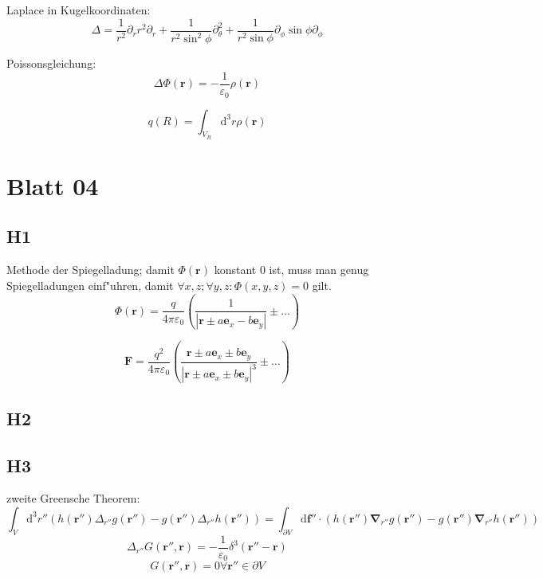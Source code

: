 \documentclass[titlepage,11pt,a4paper,ngerman]{report}
\newcommand{\dd}{\mathrm{d}}
\renewcommand{\vec}[1]{\bm{#1}}
\newcommand{\vabla}{\vec{\nabla}}
\newcommand{\vepsilon}{\varepsilon}
\begin{document}
\subsection{}

Laplace in Kugelkoordinaten:
\[\Delta=\frac{1}{r^2}\partial_rr^2\partial_r+\frac{1}{r^2\sin^2\phi}\partial_\theta^2+\frac{1}{r^2\sin\phi}\partial_\phi\sin\phi\partial_\phi\]

Poissonsgleichung:
\[\Delta\Phi(\vec{r})=-\frac{1}{\vepsilon_0}\rho(\vec{r})\]

\[q(R)=\int_{V_R}\dd^3r\rho(\vec{r})\]

\subsection{}

\subsection{}

\section{Blatt 04}

\subsection{H1}

Methode der Spiegelladung; damit $\Phi(\vec{r})$ konstant $0$ ist, muss man genug Spiegelladungen einf"uhren, damit $\forall x,z;\forall y,z:\Phi(x,y,z)=0$ gilt.
\[\Phi(\vec{r})=\frac{q}{4\pi\vepsilon_0}\left(\frac{1}{|\vec{r}\pm a\vec{e}_x-b\vec{e}_y|}\pm\ldots\right)\]

\[\vec{F}=\frac{q^2}{4\pi\vepsilon_0}\left(\frac{\vec{r}\pm a\vec{e}_x\pm b\vec{e}_y}{|\vec{r}\pm a\vec{e}_x\pm b\vec{e}_y|^3}\pm\ldots\right)\]

\subsection{H2}



\subsection{H3}

zweite Greensche Theorem:
\[\int_V\dd^3r''(h(\vec{r}'')\Delta_{r''}g(\vec{r}'')-g(\vec{r}'')\Delta_{r''}h(\vec{r}''))=\int_{\partial V}\dd\vec{f}''\cdot(h(\vec{r}'')\vabla_{r''}g(\vec{r}'')-g(\vec{r}'')\vabla_{r''}h(\vec{r}''))\]
\[
\Delta_{r''}G(\vec{r}'',\vec{r})=-\frac{1}{\vepsilon_0}\delta^3(\vec{r}''-\vec{r})
\]
\[G(\vec{r}'',\vec{r})=0\forall\vec{r}''\in\partial V\]
\end{document}
